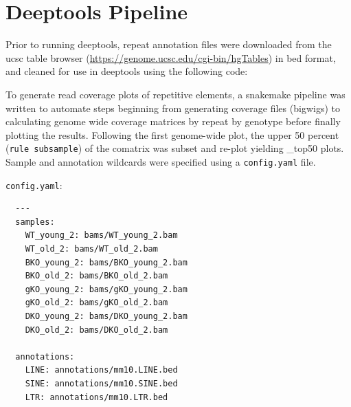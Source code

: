 \documentclass[onehalf,12pt]{beavtex}
\begin{document}
  \section{Deeptools Pipeline}\label{deeptools-pipeline}
  
  Prior to running deeptools, repeat annotation files were downloaded from
  the ucsc table browser (\url{https://genome.ucsc.edu/cgi-bin/hgTables})
  in bed format, and cleaned for use in deeptools using the following
  code:
  
  \begin{Shaded}
  \begin{Highlighting}[]
  \OperatorTok{>}
  \OperatorTok{>}
  \OperatorTok{>}
              
  \OperatorTok{>}
  \OperatorTok{>}
  \OperatorTok{>}
  
  \end{Highlighting}
  \end{Shaded}
  
  To generate read coverage plots of repetitive elements, a snakemake
  pipeline was written to automate steps beginning from generating
  coverage files (bigwigs) to calculating genome wide coverage matrices by
  repeat by genotype before finally plotting the results. Following the
  first genome-wide plot, the upper 50 percent (\texttt{rule\ subsample})
  of the comatrix was subset and re-plot yielding \_top50 plots. Sample
  and annotation wildcards were specified using a \texttt{config.yaml}
  file.
  
  \texttt{config.yaml}:
  
  \begin{verbatim}
  ---
  samples:
    WT_young_2: bams/WT_young_2.bam
    WT_old_2: bams/WT_old_2.bam
    BKO_young_2: bams/BKO_young_2.bam
    BKO_old_2: bams/BKO_old_2.bam
    gKO_young_2: bams/gKO_young_2.bam
    gKO_old_2: bams/gKO_old_2.bam
    DKO_young_2: bams/DKO_young_2.bam
    DKO_old_2: bams/DKO_old_2.bam
  
  annotations:
    LINE: annotations/mm10.LINE.bed
    SINE: annotations/mm10.SINE.bed
    LTR: annotations/mm10.LTR.bed
  \end{verbatim}
  
\end{document}
